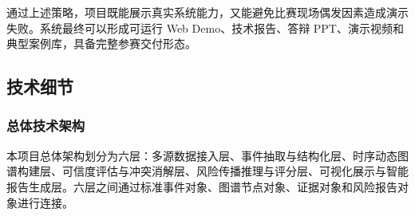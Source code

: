 \documentclass[12pt,a4paper]{article}
\begin{document}
通过上述策略，项目既能展示真实系统能力，又能避免比赛现场偶发因素造成演示失败。系统最终可以形成可运行 Web Demo、技术报告、答辩 PPT、演示视频和典型案例库，具备完整参赛交付形态。

\subsection{技术细节}

\subsubsection{总体技术架构}

本项目总体架构划分为六层：多源数据接入层、事件抽取与结构化层、时序动态图谱构建层、可信度评估与冲突消解层、风险传播推理与评分层、可视化展示与智能报告生成层。六层之间通过标准事件对象、图谱节点对象、证据对象和风险报告对象进行连接。
\end{document}
